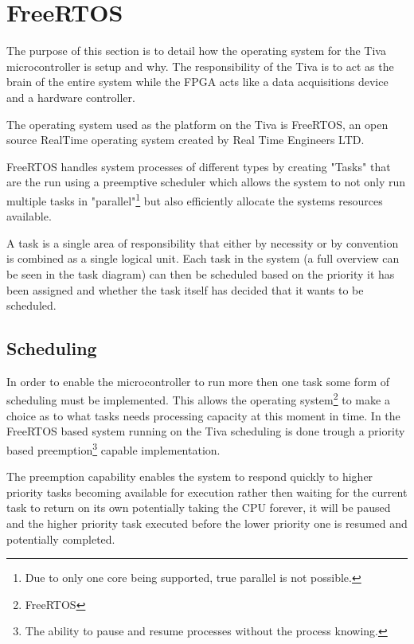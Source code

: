 \documentclass[../../../main]{subfiles}
\begin{document}
\section{FreeRTOS}

The purpose of this section is to detail how the operating system for the Tiva microcontroller is setup and why. The responsibility of the Tiva is to act as the brain of the entire system while the FPGA acts like a data acquisitions device and a hardware controller. 

The operating system used as the platform on the Tiva is FreeRTOS, an open source RealTime operating system created by Real Time Engineers LTD.

FreeRTOS handles system processes of different types by creating "Tasks" that are the run using a preemptive scheduler which allows the system to not only run multiple tasks in "parallel"\footnote{Due to only one core being supported, true parallel is not possible.} but also efficiently allocate the systems resources available.


A task is a single area of responsibility that either by necessity or by convention is combined as a single logical unit. Each task in the system (a full overview can be seen in the task diagram) can then be scheduled based on the priority it has been assigned and whether the task itself has decided that it wants to be scheduled. 

\subsection{Scheduling}

In order to enable the microcontroller to run more then one task some form of scheduling must be implemented. This allows the operating system\footnote{FreeRTOS} to make a choice as to what tasks needs processing capacity at this moment in time. In the FreeRTOS based system running on the Tiva scheduling is done trough a priority based preemption\footnote{The ability to pause and resume processes without the process knowing.} capable implementation.

The preemption capability enables the system to respond quickly to higher priority tasks becoming available for execution rather then waiting for the current task to return on its own potentially taking the CPU forever, it will be paused and the higher priority task executed before the lower priority one is resumed and potentially completed.
 
\end{document}
